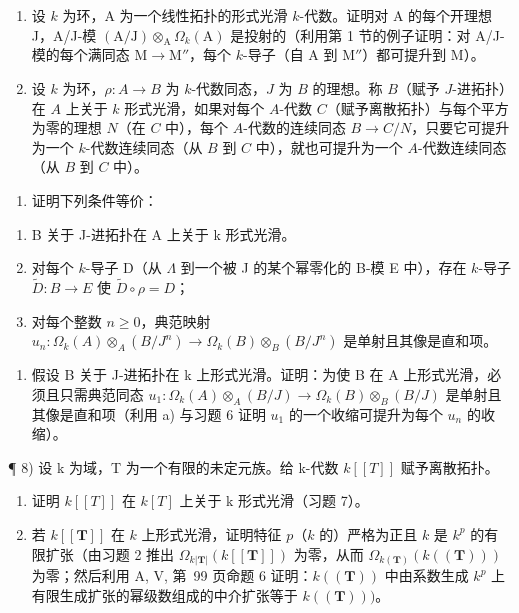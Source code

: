 \begin{enumerate}
\def\labelenumi{\arabic{enumi})}
\setcounter{enumi}{5}
\item
  设 \(k\) 为环，A 为一个线性拓扑的形式光滑 \(k\)-代数。证明对 A 的每个开理想 J，A/J-模 \((\mathrm{A} / \mathrm{J}) \otimes_{\mathrm{A}} \Omega_k(\mathrm{A})\) 是投射的（利用第 1 节的例子证明：对 A/J-模的每个满同态 \(\mathrm{M} \to \mathrm{M}''\)，每个 \(k\)-导子（自 A 到 \(\mathrm{M}''\)）都可提升到 M）。
\item
  设 \(k\) 为环，\(\rho : A \to B\) 为 \(k\)-代数同态，\(J\) 为 \(B\) 的理想。称 \(B\)（赋予 \(J\)-进拓扑）在 \(A\) 上关于 \(k\) 形式光滑，如果对每个 \(A\)-代数 \(C\)（赋予离散拓扑）与每个平方为零的理想 \(N\)（在 \(C\) 中），每个 \(A\)-代数的连续同态 \(B \to C/N\)，只要它可提升为一个 \(k\)-代数连续同态（从 \(B\) 到 \(C\) 中），就也可提升为一个 \(A\)-代数连续同态（从 \(B\) 到 \(C\) 中）。
\end{enumerate}

\begin{enumerate}
\def\labelenumi{\alph{enumi})}
\tightlist
\item
  证明下列条件等价：
\end{enumerate}

\begin{enumerate}
\def\labelenumi{(\roman{enumi})}
\item
  B 关于 J-进拓扑在 A 上关于 k 形式光滑。
\item
  对每个 \(k\)-导子 D（从 \(\Lambda\) 到一个被 J 的某个幂零化的 B-模 E 中），存在 \(k\)-导子 \(\tilde{D}: B \to E\) 使 \(\tilde{D} \circ \rho = D\)；
\item
  对每个整数 \(n \geqslant 0\)，典范映射 \(u_n: \Omega_k(A) \otimes_A (B/J^n) \longrightarrow \Omega_k(B) \otimes_B (B/J^n)\) 是单射且其像是直和项。
\end{enumerate}

\begin{enumerate}
\def\labelenumi{\alph{enumi})}
\setcounter{enumi}{1}
\tightlist
\item
  假设 B 关于 J-进拓扑在 k 上形式光滑。证明：为使 B 在 A 上形式光滑，必须且只需典范同态 \(u_{1}:\Omega_{k}(A)\otimes_{A}(B/J)\to\Omega_{k}(B)\otimes_{B}(B/J)\) 是单射且其像是直和项（利用 a) 与习题 6 证明 \(u_{1}\) 的一个收缩可提升为每个 \(u_{n}\) 的收缩）。
\end{enumerate}

¶ 8) 设 k 为域，T 为一个有限的未定元族。给 k-代数 \(k[[T]]\) 赋予离散拓扑。

\begin{enumerate}
\def\labelenumi{\alph{enumi})}
\item
  证明 \(k[[T]]\) 在 \(k[T]\) 上关于 k 形式光滑（习题 7）。
\item
  若 \(k[[\mathbf{T}]]\) 在 \(k\) 上形式光滑，证明特征 \(p\)（\(k\) 的）严格为正且 \(k\) 是 \(k^p\) 的有限扩张（由习题 2 推出 \(\Omega_{k|\mathbf{T}|}(k[[\mathbf{T}]])\) 为零，从而 \(\Omega_{k(\mathbf{T})}(k((\mathbf{T})))\) 为零；然后利用 A, V, 第~99 页命题 6 证明：\(k((\mathbf{T}))\) 中由系数生成 \(k^p\) 上有限生成扩张的幂级数组成的中介扩张等于 \(k((\mathbf{T})))\)。
\end{enumerate}

